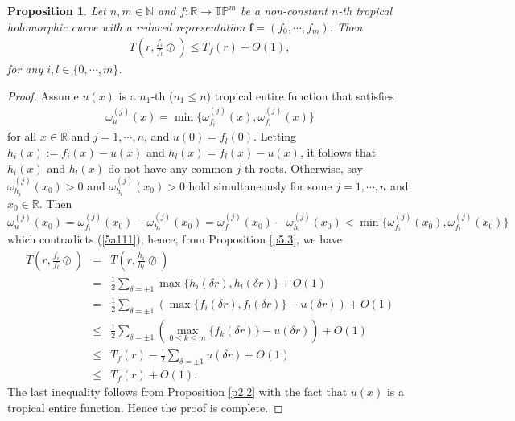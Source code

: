\documentclass{article}
\newtheorem{proposition}[defin]{Proposition}
\begin{document}
\begin{proposition}\label{p5.4}
Let $n, m\in\mathbb{N}$ and $f:\mathbb{R}\rightarrow \mathbb{T}\mathbb{P}^{m}$ be a non-constant $n$-th tropical holomorphic curve with a reduced representation $\textbf{f}=(f_{0}, \cdots, f_{m})$. Then
    \begin{eqnarray}\label{div}
        T\left(r, \frac{f_{i}}{f_{l}}\oslash\right)\leq T_{f}(r)+O(1),
    \end{eqnarray}
    for any $i, l\in\{0, \cdots, m\}$.
\end{proposition}
\begin{proof} 
   Assume $u(x)$ is a $n_{1}$-th ($n_{1}\leq n$) tropical entire function that satisfies 
   \begin{eqnarray}\label{5a111}
       \omega_{u}^{(j)}(x)=\min\{\omega_{f_{i}}^{(j)}(x), \omega_{f_{l}}^{(j)}(x)\}
   \end{eqnarray}
   for all $x\in\mathbb{R}$ and $j=1, \cdots, n$, and $u(0)=f_{l}(0)$. 
   Letting $h_{i}(x):=f_{i}(x)-u(x)$ and $h_{l}(x)=f_{l}(x)-u(x)$, it follows that $h_{i}(x)$ and $h_{l}(x)$ do not have any common $j$-th roots. Otherwise, say $\omega_{h_{i}}^{(j)}(x_{0})>0$ and $\omega_{h_{l}}^{(j)}(x_{0})>0$ hold simultaneously for some $j=1, \cdots, n$ and $x_{0}\in\mathbb{R}$. Then $\omega_{u}^{(j)}(x_{0})=\omega_{f_{i}}^{(j)}(x_{0})-\omega_{h_{i}}^{(j)}(x_{0})=\omega_{f_{l}}^{(j)}(x_{0})-\omega_{h_{l}}^{(j)}(x_{0})<\min\{\omega_{f_{i}}^{(j)}(x_{0}), \omega_{f_{l}}^{(j)}(x_{0})\}$ which contradicts (\ref{5a111}), hence, from Proposition \ref{p5.3}, we have
    \begin{eqnarray*}
        T\left(r, \frac{f_{i}}{f_{l}}\oslash\right)&=&T\left(r, \frac{h_{i}}{h_{l}}\oslash\right)\\
        &=&\frac{1}{2}\sum_{\delta=\pm 1}\max\{h_{i}(\delta r), h_{l}(\delta r)\}+O(1)\\
        &=&\frac{1}{2}\sum_{\delta=\pm 1}\left(\max\{f_{i}(\delta r), f_{l}(\delta r)\}-u(\delta r)\right)+O(1)\\
        &\leq&\frac{1}{2}\sum_{\delta=\pm 1}\left(\max\limits_{0\leq k\leq m}\{f_{k}(\delta r)\}-u(\delta r)\right)+O(1)\\
        &\leq&T_{f}(r)-\frac{1}{2}\sum_{\delta=\pm 1}u(\delta r)+O(1)\\
        &\leq&T_{f}(r)+O(1).
    \end{eqnarray*}
    The last inequality follows from Proposition \ref{p2.2} with the fact that $u(x)$ is a tropical entire function. Hence the proof is complete.
\end{proof}
\end{document}
